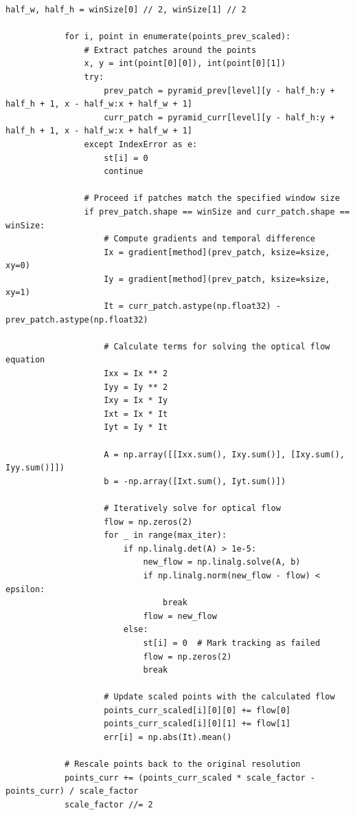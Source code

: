 \documentclass[11pt, conference, letterpaper]{IEEEtran}
\begin{document}
\begin{lstlisting}[style=python, caption={\texttt{lucas\_kanade.py}}, label={lst:lk}]
            half_w, half_h = winSize[0] // 2, winSize[1] // 2
    
            for i, point in enumerate(points_prev_scaled):
                # Extract patches around the points
                x, y = int(point[0][0]), int(point[0][1])
                try:
                    prev_patch = pyramid_prev[level][y - half_h:y + half_h + 1, x - half_w:x + half_w + 1]
                    curr_patch = pyramid_curr[level][y - half_h:y + half_h + 1, x - half_w:x + half_w + 1]
                except IndexError as e:
                    st[i] = 0
                    continue
    
                # Proceed if patches match the specified window size
                if prev_patch.shape == winSize and curr_patch.shape == winSize:
                    # Compute gradients and temporal difference
                    Ix = gradient[method](prev_patch, ksize=ksize, xy=0)
                    Iy = gradient[method](prev_patch, ksize=ksize, xy=1)
                    It = curr_patch.astype(np.float32) - prev_patch.astype(np.float32)
    
                    # Calculate terms for solving the optical flow equation
                    Ixx = Ix ** 2
                    Iyy = Iy ** 2
                    Ixy = Ix * Iy
                    Ixt = Ix * It
                    Iyt = Iy * It
    
                    A = np.array([[Ixx.sum(), Ixy.sum()], [Ixy.sum(), Iyy.sum()]])
                    b = -np.array([Ixt.sum(), Iyt.sum()])
    
                    # Iteratively solve for optical flow
                    flow = np.zeros(2)
                    for _ in range(max_iter):
                        if np.linalg.det(A) > 1e-5:
                            new_flow = np.linalg.solve(A, b)
                            if np.linalg.norm(new_flow - flow) < epsilon:
                                break
                            flow = new_flow
                        else:
                            st[i] = 0  # Mark tracking as failed
                            flow = np.zeros(2)
                            break
    
                    # Update scaled points with the calculated flow
                    points_curr_scaled[i][0][0] += flow[0]
                    points_curr_scaled[i][0][1] += flow[1]
                    err[i] = np.abs(It).mean()
    
            # Rescale points back to the original resolution
            points_curr += (points_curr_scaled * scale_factor - points_curr) / scale_factor
            scale_factor //= 2
    

\end{lstlisting}
\end{document}
